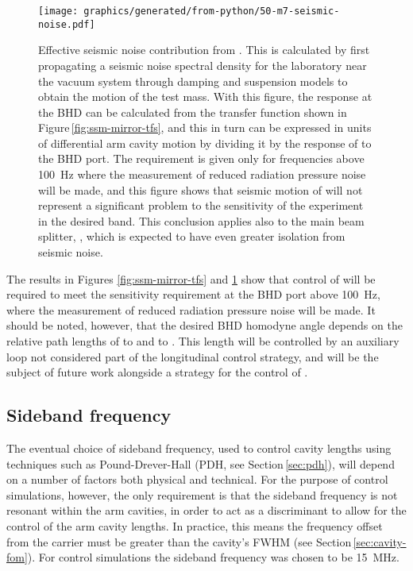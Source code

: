 \begin{figure}
  \centering
  \texttt{[image: graphics/generated/from-python/50-m7-seismic-noise.pdf]}
  \caption[Effective \LMINUS{} seismic noise contribution from \MSEVEN{}]{\label{fig:m7-seismic-noise}Effective \LMINUS{} seismic noise contribution from \MSEVEN{}. This is calculated by first propagating a seismic noise spectral density for the laboratory near the vacuum system through damping and suspension models to obtain the motion of the \MSEVEN{} test mass. With this figure, the response at the \gls{BHD} can be calculated from the transfer function shown in Figure\,\ref{fig:ssm-mirror-tfs}, and this in turn can be expressed in units of differential arm cavity motion by dividing it by the response of \LMINUS{} to the \gls{BHD} port. The requirement is given only for frequencies above \SI{100}{\hertz} where the measurement of reduced radiation pressure noise will be made, and this figure shows that seismic motion of \MSEVEN{} will not represent a significant problem to the sensitivity of the experiment in the desired band. This conclusion applies also to the main beam splitter, \MSIX{}, which is expected to have even greater isolation from seismic noise.}
\end{figure}

The results in Figures \ref{fig:ssm-mirror-tfs} and \ref{fig:m7-seismic-noise} show that control of \LMINUS{} will be required to meet the sensitivity requirement at the \gls{BHD} port above \SI{100}{\hertz}, where the measurement of reduced radiation pressure noise will be made. It should be noted, however, that the desired \gls{BHD} homodyne angle depends on the relative path lengths of \MELEVEN{} to \MSIXTEEN{} and \MSIX{} to \MSIXTEEN{}. This length will be controlled by an auxiliary loop not considered part of the longitudinal control strategy, and will be the subject of future work alongside a strategy for the control of \LPLUS{}.

\subsection{Sideband frequency}
The eventual choice of sideband frequency, used to control cavity lengths using techniques such as Pound-Drever-Hall (\gls{PDH}, see Section\,\ref{sec:pdh}), will depend on a number of factors both physical and technical. For the purpose of control simulations, however, the only requirement is that the sideband frequency is not resonant within the arm cavities, in order to act as a discriminant to allow for the control of the arm cavity lengths. In practice, this means the frequency offset from the carrier must be greater than the cavity's \gls{FWHM} (see Section\,\ref{sec:cavity-fom}). For control simulations the sideband frequency was chosen to be \SI{15}{\mega\hertz}.

